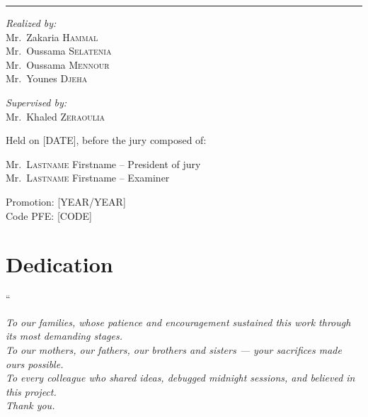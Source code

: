 \documentclass[12pt,a4paper]{report}
\begin{document}
\begin{titlepage}
\vspace{0.3cm}
\rule{\textwidth}{0.6pt}
\vspace{0.3cm}

\begin{minipage}{0.45\textwidth}
\normalsize \textit{Realized by:}\\
Mr.~Zakaria \textsc{Hammal}\\
Mr.~Oussama \textsc{Selatenia}\\
Mr.~Oussama \textsc{Mennour}\\
Mr.~Younes \textsc{Djeha}
\end{minipage}
\hfill
\begin{minipage}{0.45\textwidth}
\normalsize \textit{Supervised by:}\\
Mr.~Khaled \textsc{Zeraoulia}
\end{minipage}

\vspace{1cm}

{\normalsize Held on [DATE], before the jury composed of:}

{\normalsize Mr.~\textsc{Lastname} Firstname \hspace{0.5cm} -- President of jury}\\
{\normalsize Mr.~\textsc{Lastname} Firstname \hspace{0.5cm} -- Examiner}

\vspace{0.8cm}

{\normalsize Promotion: [YEAR/YEAR]}\\
{\normalsize Code PFE: [CODE]}

\end{titlepage}
\restoregeometry


\newpage
\chapter*{Dedication}
\thispagestyle{empty}

\vspace{1.5cm}

{\large ``}

\begin{center}
\itshape
To our families, whose patience and encouragement sustained this work through its
most demanding stages.\\[0.6cm]
To our mothers, our fathers, our brothers and sisters — your sacrifices made ours
possible.\\[0.6cm]
To every colleague who shared ideas, debugged midnight sessions, and believed in
this project.\\[0.8cm]
Thank you.
\end{center}
\end{document}
